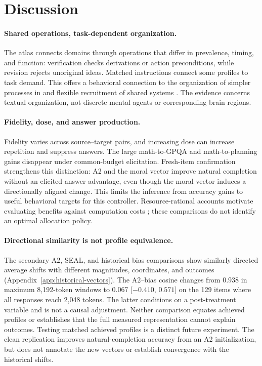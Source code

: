 \section{Discussion}
\paragraph{Shared operations, task-dependent organization.}
The atlas connects domains through operations that differ in prevalence, timing, and function: verification checks derivations or action preconditions, while revision rejects unoriginal ideas. Matched instructions connect some profiles to task demand. This offers a behavioral connection to the organization of simpler processes in \citet{minsky1986society} and flexible recruitment of shared systems \citep{cole2013hubs}. The evidence concerns textual organization, not discrete mental agents or corresponding brain regions.

\paragraph{Fidelity, dose, and answer production.}
Fidelity varies across source--target pairs, and increasing dose can increase repetition and suppress answers. The large math-to-GPQA and math-to-planning gains disappear under common-budget elicitation. Fresh-item confirmation strengthens this distinction: A2 and the moral vector improve natural completion without an elicited-answer advantage, even though the moral vector induces a directionally aligned change. This limits the inference from accuracy gains to useful behavioral targets for this controller. Resource-rational accounts motivate evaluating benefits against computation costs \citep{shenhav2013control,lieder2020resource}; these comparisons do not identify an optimal allocation policy.

\paragraph{Directional similarity is not profile equivalence.}
The secondary A2, SEAL, and historical bias comparisons show similarly directed average shifts with different magnitudes, coordinates, and outcomes (Appendix~\ref{app:historical-vectors}). The A2--bias cosine changes from 0.938 in maximum 8,192-token windows to 0.067 [$-0.410$, $0.571$] on the 129 items where all responses reach 2,048 tokens. The latter conditions on a post-treatment variable and is not a causal adjustment. Neither comparison equates achieved profiles or establishes that the full measured representation cannot explain outcomes. Testing matched achieved profiles is a distinct future experiment. The clean replication improves natural-completion accuracy from an A2 initialization, but does not annotate the new vectors or establish convergence with the historical shifts.

